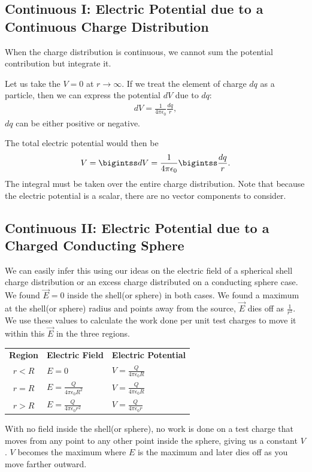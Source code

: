 \documentclass[12pt,b4paper]{article}
\begin{document}
\subsection{Continuous I: Electric Potential due to a Continuous Charge Distribution}
When the charge distribution is continuous, we cannot sum the potential contribution but integrate it.

Let us take the $V=0$ at $r\to\infty$. If we treat the element of charge $dq$ as a particle, then we can express the potential $dV$ due to $dq$:
\begin{align}
    dV=\frac{1}{4\pi\epsilon_0}\frac{dq}{r},
\end{align}
$dq$ can be either positive or negative.

The total electric potential would then be
\begin{align}
    V=\bigintss dV=\frac{1}{4\pi\epsilon_0}\bigintss\frac{dq}{r}.
\end{align}
The integral must be taken over the entire charge distribution. Note that because
the electric potential is a scalar, there are no vector components to consider.
\subsection{Continuous II: Electric Potential due to a Charged Conducting Sphere}
We can easily infer this using our ideas on the electric field of a spherical shell charge distribution or an excess charge distributed on a conducting sphere case. We found $\vec{E}=0$ inside the shell(or sphere) in both cases. We found a maximum at the shell(or sphere) radius and points away from the source, $\vec{E}$ dies off as $\displaystyle\frac{1}{r^2}$. We use these values to calculate the work done per unit test charges to move it within this $\vec{E}$ in the three regions.
\begin{center}
\begin{tabular}{cll}
    \textbf{Region} & \textbf{Electric Field} & \textbf{Electric Potential} \\[3pt]
    $r<R$ & $\displaystyle E=0$ & $\displaystyle V=\frac{Q}{4\pi\epsilon_0R}$ \\[6pt]
    $r=R$ & $\displaystyle E=\frac{Q}{4\pi\epsilon_0 R^2}$ & $\displaystyle V=\frac{Q}{4\pi\epsilon_0R}$ \\[8pt]
    $r>R$ & $\displaystyle E=\frac{Q}{4\pi\epsilon_0 r^2}$ & $\displaystyle V=\frac{Q}{4\pi\epsilon_0r}$
\end{tabular}
\end{center}
With no field inside the shell(or sphere), no work is done on a test charge that moves from any point to any other point inside the sphere, giving us a constant $V$. $V$ becomes the maximum where $E$ is the maximum and later dies off as you move farther outward.
\end{document}
